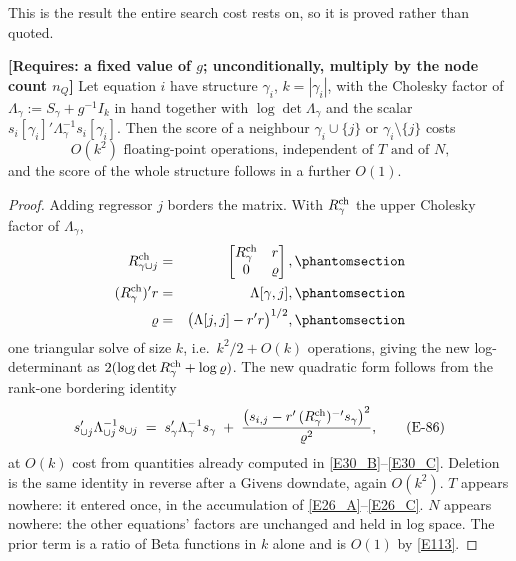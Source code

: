 This is the result the entire search cost rests on, so it is proved rather than
quoted.

\begin{proposition}\label{prop:flip}
\textbf{[Requires: a fixed value of $g$; unconditionally, multiply by the node count
$n_Q$]} Let equation $i$ have structure $\gamma_i$, $k=|\gamma_i|$, with the Cholesky
factor of $\Lambda_\gamma := S_\gamma + g^{-1}I_k$ in hand together with
$\log\det\Lambda_\gamma$ and the scalar
$s_i[\gamma_i]'\Lambda_\gamma^{-1}s_i[\gamma_i]$. Then the score of a neighbour
$\gamma_i\cup\{j\}$ or $\gamma_i\setminus\{j\}$ costs
\begin{equation}
O(k^2)\text{ floating-point operations, independent of $T$ and of $N$,}
\tag{E-85}\label{E85}
\end{equation}
and the score of the whole structure follows in a further $O(1)$.
\end{proposition}

\begin{proof}
Adding regressor $j$ borders the matrix. With $R^{\mathrm{ch}}_\gamma$ the upper Cholesky
factor of $\Lambda_\gamma$,
\begin{eqnarray}
R^{\ch}_{\gamma\cup j} &=&
  \begin{bmatrix} R^{\ch}_\gamma & r \\ 0 & \varrho \end{bmatrix},
  \Elabel{E-30A}{E30_A} \\
(R^{\ch}_\gamma)' r &=& \Lambda[\gamma,j],
  \Elabel{E-30B}{E30_B} \\
\varrho &=& \bigl(\Lambda[j,j] - r'r\bigr)^{1/2},
  \Elabel{E-30C}{E30_C}
\end{eqnarray}
one triangular solve of size $k$, i.e.\ $k^2/2+O(k)$ operations, giving the new
log-determinant as $2(\log\det R^{\mathrm{ch}}_\gamma + \log\varrho)$. The new quadratic form
follows from the rank-one bordering identity
\begin{equation}
s_{\cup j}'\Lambda_{\cup j}^{-1}s_{\cup j} \;=\; s_\gamma'\Lambda_\gamma^{-1}s_\gamma
\;+\; \frac{\bigl(s_{i,j} - r'\,(R^{\mathrm{ch}}_\gamma)^{-\prime} s_\gamma\bigr)^2}{\varrho^2},
\tag{E-86}\label{E86}
\end{equation}
at $O(k)$ cost from quantities already computed in \eqref{E30_B}--\eqref{E30_C}. Deletion is the same
identity in reverse after a Givens downdate, again $O(k^2)$. $T$ appears nowhere: it
entered once, in the accumulation of \eqref{E26_A}--\eqref{E26_C}. $N$ appears nowhere: the other
equations' factors are unchanged and held in log space. The prior term is a ratio of
Beta functions in $k$ alone and is $O(1)$ by \eqref{E113}.
\end{proof}

